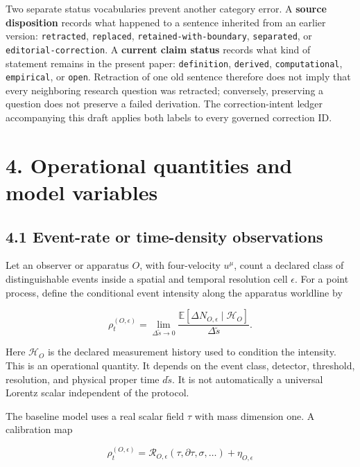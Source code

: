 \documentclass[
  american,
  11pt,
  letterpaper,
]{article}
\begin{document}
Two separate status vocabularies prevent another category error. A \textbf{source disposition} records what happened to a sentence inherited from an earlier version: \texttt{retracted}, \texttt{replaced}, \nolinkurl{retained-with-boundary}, \texttt{separated}, or \nolinkurl{editorial-correction}. A \textbf{current claim status} records what kind of statement remains in the present paper: \texttt{definition}, \texttt{derived}, \texttt{computational}, \texttt{empirical}, or \texttt{open}. Retraction of one old sentence therefore does not imply that every neighboring research question was retracted; conversely, preserving a question does not preserve a failed derivation. The correction-intent ledger accompanying this draft applies both labels to every governed correction ID.

\section{4. Operational quantities and model variables}\label{operational-quantities-and-model-variables}

\subsection{4.1 Event-rate or time-density observations}\label{event-rate-or-time-density-observations}

Let an observer or apparatus \(O\), with four-velocity \(u^\mu\), count a declared class of distinguishable events inside a spatial and temporal resolution cell \(\epsilon\). For a point process, define the conditional event intensity along the apparatus worldline by

\begin{equation}
\rho_{t}^{(O,\epsilon)}=\lim_{\Delta\tilde{s}\to 0}
\frac{\mathbb E[\Delta N_{O,\epsilon}\mid\mathcal H_O]}
{\Delta\tilde{s}} .
\tag{1}
\end{equation}

Here \(\mathcal H_O\) is the declared measurement history used to condition the intensity. This is an operational quantity. It depends on the event class, detector, threshold, resolution, and physical proper time \(d\tilde{s}\). It is not automatically a universal Lorentz scalar independent of the protocol.

The baseline model uses a real scalar field \(\tau\) with mass dimension one. A calibration map

\begin{equation}
\rho_{t}^{(O,\epsilon)}
=\mathcal{R}_{O,\epsilon}(\tau,\partial\tau,\sigma,\ldots)
+\eta_{O,\epsilon}
\tag{2}
\end{equation}
\end{document}
